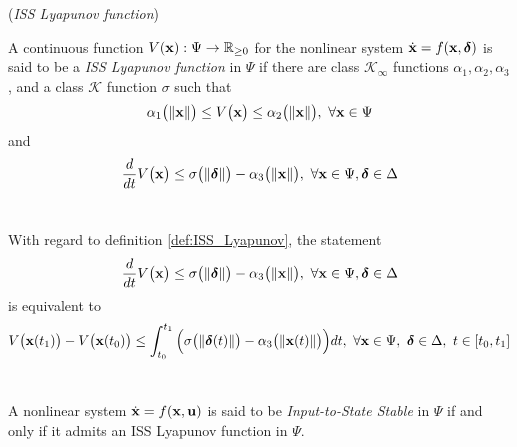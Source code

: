 \begin{definition}\cite{marquez2003nonlinear} (\textit{ISS Lyapunov function})
\label{def:ISS_Lyapunov}

A continuous function $V(\bm{\mathbf{x}}) : \Psi \to \mathbb{R}_{\geq 0}$ for the
nonlinear system $\dot{\bm{\mathbf{x}}} = f(\bm{\mathbf{x}}, \bm{\mathbf{\delta}})$ is said to be a
\textit{ISS Lyapunov function} in $\Psi$ if there are class
$\mathcal{K}_{\infty}$ functions
$\alpha_1, \alpha_2, \alpha_3$, and a class $\mathcal{K}$ function
$\sigma$ such that
\begin{align}
  \alpha_1\big(\|\bm{\mathbf{x}}\|\big) \leq V\big(\bm{\mathbf{x}}\big) \leq \alpha_2\big(\|\bm{\mathbf{x}}\|\big),\ \forall \bm{\mathbf{x}} \in \Psi
\end{align}
and
\begin{align}
  \dfrac{d}{dt}V\big(\bm{\mathbf{x}}\big)
    \leq \sigma\big(\|\bm{\mathbf{\delta}}\|\big) - \alpha_3\big(\|\bm{\mathbf{x}}\|\big),\ \forall \bm{\mathbf{x}} \in \Psi, \bm{\mathbf{\delta}} \in \Delta
\end{align}
\\[2.5ex]
\end{definition}


\newpage
\begin{remark}
\label{remark:ISS_Lyapunov}

With regard to definition \eqref{def:ISS_Lyapunov}, the statement
\begin{align}
  \dfrac{d}{dt}V\big(\bm{\mathbf{x}}\big)
    \leq \sigma\big(\|\bm{\mathbf{\delta}}\|\big) - \alpha_3\big(\|\bm{\mathbf{x}}\|\big),\ \forall \bm{\mathbf{x}} \in \Psi, \bm{\mathbf{\delta}} \in \Delta
\end{align}
is equivalent to
\begin{align}
  V\big(\bm{\mathbf{x}}(t_1)\big) - V\big(\bm{\mathbf{x}}(t_0)\big)
  \leq \int_{t_0}^{t_1}\Big(\sigma\big(\|\bm{\mathbf{\delta}}(t)\|\big) - \alpha_3\big(\|\bm{\mathbf{x}}(t)\|\big)\Big)dt,\
    \forall \bm{\mathbf{x}} \in \Psi,\ \bm{\mathbf{\delta}} \in \Delta,\ t \in [t_0, t_1]
\end{align}
\\[2.5ex]
\end{remark}


\begin{theorem}\cite{marquez2003nonlinear}
\label{def:ISS_Lyapunov_admit_theorem}

  A nonlinear system $\dot{\bm{\mathbf{x}}} = f(\bm{\mathbf{x}},\bm{\mathbf{u}})$ is said
  to be \textit{Input-to-State Stable} in $\Psi$ if and only if it admits an
  ISS Lyapunov function in $\Psi$.
\\[2.5ex]
\end{theorem}


